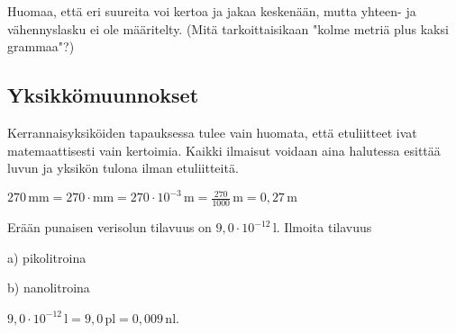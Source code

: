 

Huomaa, että eri suureita voi kertoa ja jakaa keskenään, mutta yhteen- ja vähennyslasku ei ole määritelty. (Mitä tarkoittaisikaan "kolme metriä plus kaksi grammaa"?)

\subsection*{Yksikkömuunnokset}

Kerrannaisyksiköiden tapauksessa tulee vain huomata, että etuliitteet ivat matemaattisesti vain kertoimia. Kaikki ilmaisut voidaan aina halutessa esittää luvun ja yksikön tulona ilman etuliitteitä. %

\begin{esimerkki}
$270\,\text{mm}=270\cdot\text{mm}=270\cdot10^{-3}\,\text{m}=\frac{270}{1000}\,\text{m}=0,27\,\text{m}$
\end{esimerkki}

\begin{esimerkki}
Erään punaisen verisolun tilavuus on $9,0 \cdot 10^{-12}\,\textrm{l}$. Ilmoita tilavuus

a) pikolitroina

b) nanolitroina

\begin{esimratk}
$9,0 \cdot 10^{-12}\,\textrm{l} = 9,0\,\textrm{pl} = 0,009\,\textrm{nl}$.
\end{esimratk}
\end{esimerkki}


